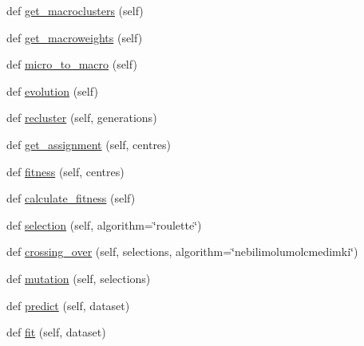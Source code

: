 \begin{DoxyCompactItemize}
def \hyperlink{classEvoStreamV2_1_1EvoStreamV2_aa109c8c73487b5940a7e650b2dee9931}{get\+\_\+macroclusters} (self)
\item 
def \hyperlink{classEvoStreamV2_1_1EvoStreamV2_af0c09a2f7f421c999cec4cc862948779}{get\+\_\+macroweights} (self)
\item 
def \hyperlink{classEvoStreamV2_1_1EvoStreamV2_ad34fd72db0cf02cc791c218bd6c77f03}{micro\+\_\+to\+\_\+macro} (self)
\item 
def \hyperlink{classEvoStreamV2_1_1EvoStreamV2_af1ccc87172749cda2b0b8b923a1d1661}{evolution} (self)
\item 
def \hyperlink{classEvoStreamV2_1_1EvoStreamV2_a85fd2b6b4cae34a446916c508e111f85}{recluster} (self, generations)
\item 
def \hyperlink{classEvoStreamV2_1_1EvoStreamV2_afd60e1e8e0d880c8ca534a9e056c3316}{get\+\_\+assignment} (self, centres)
\item 
def \hyperlink{classEvoStreamV2_1_1EvoStreamV2_aa2c7f1152f8cd186a9206df6c584c29a}{fitness} (self, centres)
\item 
def \hyperlink{classEvoStreamV2_1_1EvoStreamV2_a9e3a46ef52e2558c648383f9ade1b0ce}{calculate\+\_\+fitness} (self)
\item 
def \hyperlink{classEvoStreamV2_1_1EvoStreamV2_aa24daf24edd3b50bd69f05e1032b5908}{selection} (self, algorithm=\char`\"{}roulette\char`\"{})
\item 
def \hyperlink{classEvoStreamV2_1_1EvoStreamV2_a791146062e4cd1436583016c46355741}{crossing\+\_\+over} (self, selections, algorithm=\char`\"{}nebilimolumolcmedimki\char`\"{})
\item 
def \hyperlink{classEvoStreamV2_1_1EvoStreamV2_aef6d2403f692a5e5f8efd3573856c063}{mutation} (self, selections)
\item 
def \hyperlink{classEvoStreamV2_1_1EvoStreamV2_afaff7b3cc2df5507432d2feb472beea1}{predict} (self, dataset)
\item 
def \hyperlink{classEvoStreamV2_1_1EvoStreamV2_a495f59d59b5a9876882ad8483d55e06d}{fit} (self, dataset)
\end{DoxyCompactItemize}

